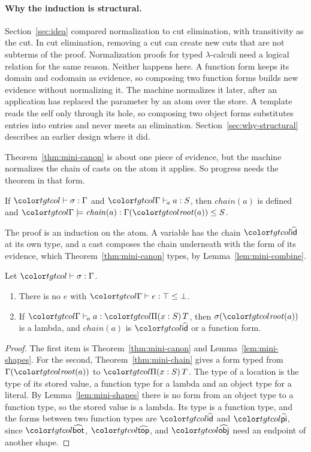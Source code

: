 \paragraph{Why the induction is structural.}
Section~\ref{sec:idea} compared normalization to cut elimination, with transitivity as the cut. In cut elimination, removing a cut can create new cuts that are not subterms of the proof. Normalization proofs for typed $\lambda$-calculi need a logical relation for the same reason. Neither happens here. A function form keeps its domain and codomain as evidence, so composing two function forms builds new evidence without normalizing it. The machine normalizes it later, after an application has replaced the parameter by an atom over the store. A template reads the self only through its hole, so composing two object forms substitutes entries into entries and never meets an elimination. Section~\ref{sec:why-structural} describes an earlier design where it did.

Theorem~\ref{thm:mini-canon} is about one piece of evidence, but the machine normalizes the chain of casts on the atom it applies. So progress needs the theorem in that form.

\begin{theorem}\label{thm:mini-chain}
If $\storej{\sigma}{\Gamma}$ and $\atomj{\Gamma}{a}{S}$, then $\mathit{chain}(a)$ is defined and $\formj{\Gamma}{\mathit{chain}(a)}{\Gamma(\rt{a})}{S}$.
\end{theorem}

The proof is an induction on the atom. A variable has the chain $\form{id}$ at its own type, and a cast composes the chain underneath with the form of its evidence, which Theorem~\ref{thm:mini-canon} types, by Lemma~\ref{lem:mini-combine}.

\begin{corollary}\label{cor:mini}
Let $\storej{\sigma}{\Gamma}$.
\begin{enumerate}
\item There is no $e$ with $\lej{\Gamma}{e}{\top}{\bot}$.
\item If $\atomj{\Gamma}{a}{\pit{S}{T}}$, then $\sigma(\rt{a})$ is a lambda, and $\mathit{chain}(a)$ is $\form{id}$ or a function form.
\end{enumerate}
\end{corollary}

\begin{proof}
The first item is Theorem~\ref{thm:mini-canon} and Lemma~\ref{lem:mini-shapes}. For the second, Theorem~\ref{thm:mini-chain} gives a form typed from $\Gamma(\rt{a})$ to $\pit{S}{T}$. The type of a location is the type of its stored value, a function type for a lambda and an object type for a literal. By Lemma~\ref{lem:mini-shapes} there is no form from an object type to a function type, so the stored value is a lambda. Its type is a function type, and the forms between two function types are $\form{id}$ and $\form{pi}$, since $\form{bot}$, $\form{top}$, and $\form{obj}$ need an endpoint of another shape.
\end{proof}

